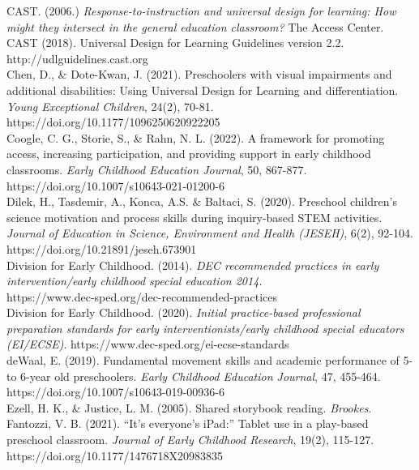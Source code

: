 \documentclass[11.5pt]{sig-alternate}
\begin{document}
CAST. (2006.) \textit{Response-to-instruction and universal design for learning: How might they 
intersect in the general education classroom?} The Access Center.
CAST (2018). Universal Design for Learning Guidelines version 2.2. 
http://udlguidelines.cast.org
\\
\newpage
Chen, D., \& Dote-Kwan, J. (2021). Preschoolers with visual impairments and additional disabilities: Using Universal Design for Learning and differentiation. \textit{Young Exceptional Children}, 24(2), 70-81. \\https://doi.org/10.1177/1096250620922205 
\\

Coogle, C. G., Storie, S., \& Rahn, N. L. (2022). A framework for promoting access, increasing 
participation, and providing support in early childhood classrooms. \textit{Early Childhood Education Journal}, 50, 867-877. \\https://doi.org/10.1007/s10643-021-01200-6 
\\

Dilek, H., Tasdemir, A., Konca, A.S. \& Baltaci, S. (2020). Preschool children’s science 
motivation and process skills during inquiry-based STEM activities. \textit{Journal of Education in Science, Environment and Health (JESEH)}, 6(2), 92-104. https://doi.org/10.21891/jeseh.673901 
\\

Division for Early Childhood. (2014). \textit{DEC recommended practices in early intervention/early 
childhood special education 2014.} \\https://www.dec-sped.org/dec-recommended-practices 
\\

Division for Early Childhood. (2020). \textit{Initial practice-based professional preparation standards 
for early interventionists/early childhood special educators (EI/ECSE)}. https://www.dec-sped.org/ei-ecse-standards 
\\

deWaal, E. (2019). Fundamental movement skills and academic performance of 5-to 6-year old 
preschoolers. \textit{Early Childhood Education Journal}, 47, 455-464. \\https://doi.org/10.1007/s10643-019-00936-6 
\\

Ezell, H. K., \& Justice, L. M. (2005). Shared storybook reading. \textit{Brookes}.
\\

Fantozzi, V. B. (2021). “It’s everyone’s iPad:” Tablet use in a play-based preschool classroom. 
\textit{Journal of Early Childhood Research}, 19(2), 115-127. \\https://doi.org/10.1177/1476718X20983835 
\\
\end{document}
